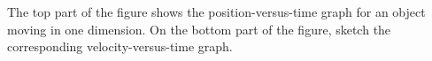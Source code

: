 The top part of the figure shows the position-versus-time
graph for an object moving in one dimension.  On the bottom
part of the figure, sketch the corresponding velocity-versus-time graph.
